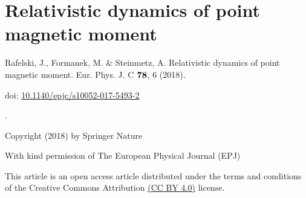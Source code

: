\chapter{Relativistic dynamics of point magnetic moment}
\label{appendixC}
\begin{center}
Rafelski, J., Formanek, M. \& Steinmetz, A. Relativistic dynamics of point magnetic moment. Eur. Phys. J. C $\boldsymbol{78}$, 6 (2018).

doi: \href{https://doi.org/10.1140/epjc/s10052-017-5493-2}{10.1140/epjc/s10052-017-5493-2}

.

Copyright (2018) by Springer Nature

With kind permission of The European Physical Journal (EPJ)

This article is an open access article distributed under the terms and conditions of the Creative Commons Attribution \href{https://creativecommons.org/licenses/by/4.0/}{(CC BY 4.0)} license.
\end{center}






%


